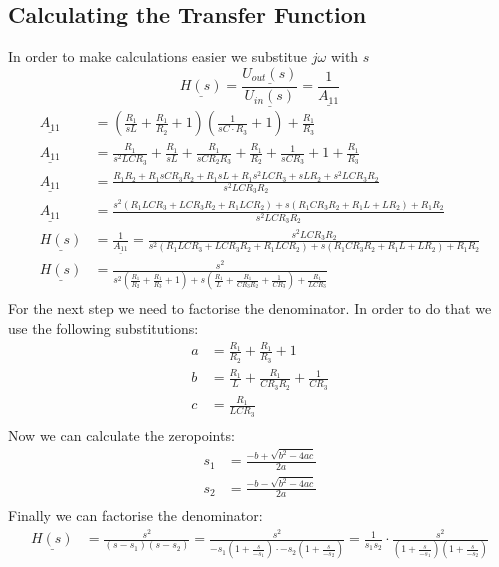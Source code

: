 \documentclass[a4paper]{article}
\begin{document}
\pagebreak

\subsection{Calculating the Transfer Function}
In order to make calculations easier we substitue $j\omega$ with $s$
\begin{equation*}
	\underline{H(s)} = \frac{\underline{U_{out}(s)}}{\underline{U_{in}(s)}} = \frac{1}{\underline{A_{11}}}
\end{equation*}
\begin{align*}
	\underline{A_{11}} &= \left(\frac{R_1}{sL} + \frac{R_1}{R_2} + 1\right)\left(\frac{1}{sC \cdot R_3} + 1\right) + \frac{R_1}{R_3}\\
	\underline{A_{11}} &= \frac{R_1}{s^2LCR_3} + \frac{R_1}{sL} + \frac{R_1}{sCR_2R_3} + \frac{R_1}{R_2} + \frac{1}{sCR_3} + 1 + \frac{R_1}{R_3}\\
	\underline{A_{11}} &= \frac{R_1R_2 + R_1sCR_3R_2 + R_1sL + R_1s^2LCR_3 + sLR_2 + s^2LCR_3R_2}{s^2LCR_3R_2}\\
	\underline{A_{11}} &= \frac{s^2(R_1LCR_3 + LCR_3R_2 + R_1LCR_2) + s(R_1CR_3R_2 + R_1L + LR_2) + R_1R_2}{s^2LCR_3R_2}\\
	\underline{H(s)} &= \frac{1}{\underline{A_{11}}} = \frac{s^2LCR_3R_2}{s^2(R_1LCR_3 + LCR_3R_2 + R_1LCR_2) + s(R_1CR_3R_2 + R_1L + LR_2) + R_1R_2}\\
	\underline{H(s)} &= \frac{s^2}{s^2\left( \frac{R_1}{R_2} + \frac{R_1}{R_3} + 1 \right) + s\left( \frac{R_1}{L} + \frac{R_1}{CR_3R_2} + \frac{1}{CR_3} \right) + \frac{R_1}{LCR_3}}\\
\end{align*}
For the next step we need to factorise the denominator. In order to do that we use the following substitutions:
\begin{align*}
	a &= \frac{R_1}{R_2} + \frac{R_1}{R_3} + 1\\
	b &= \frac{R_1}{L} + \frac{R_1}{CR_3R_2} + \frac{1}{CR_3}\\
	c &= \frac{R_1}{LCR_3}\\
\end{align*}
Now we can calculate the zeropoints:
\begin{align*}
	s_1 & = \frac{-b + \sqrt{b^2 - 4ac}}{2a}\\
	s_2 & = \frac{-b - \sqrt{b^2 - 4ac}}{2a}\\
\end{align*}
Finally we can factorise the denominator:
\begin{align*}
	\underline{H(s)} &= \frac{s^2}{(s-s_1)(s-s_2)} = \frac{s^2}{-s_1\left(1 + \frac{s}{-s_1}\right) \cdot -s_2\left(1 + \frac{s}{-s_2}\right)} =
	\frac{1}{s_1s_2} \cdot \frac{s^2}{\left(1 + \frac{s}{-s_1}\right) \left(1 + \frac{s}{-s_2}\right)}
\end{align*}
\end{document}
